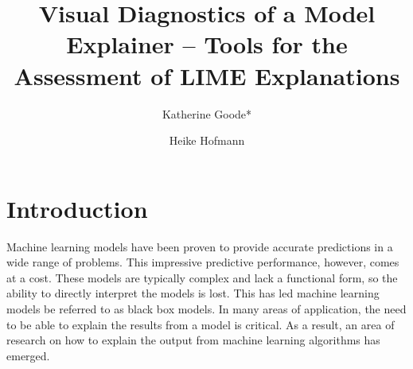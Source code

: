 \documentclass[AMS,STIX2COL]{WileyNJD-v2}
\begin{document}


\title{Visual Diagnostics of a Model Explainer -- Tools for the Assessment of LIME Explanations}

\author[1]{Katherine Goode*}

\author[1,2]{Heike Hofmann}


\address[1]{, , }

\address[2]{, , }






\maketitle

\section{Introduction}

Machine learning models have been proven to provide accurate predictions in a wide range of problems. This impressive predictive performance, however, comes at a cost. These models are typically complex and lack a functional form, so the ability to directly interpret the models is lost. This has led machine learning models be referred to as black box models. In many areas of application, the need to be able to explain the results from a model is critical. As a result, an area of research on how to explain the output from machine learning algorithms has emerged.
\end{document}
